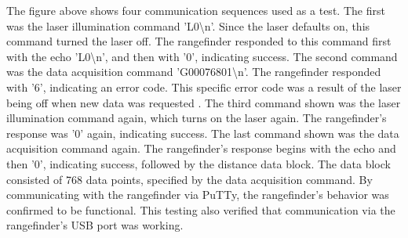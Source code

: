 The figure above shows four communication sequences used as a test. The first was the laser illumination command 'L0\textbackslash{}n'. Since the laser defaults on, this command turned the laser off. The rangefinder responded to this command first with the echo 'L0\textbackslash{}n', and then with '0', indicating success. The second command was the data acquisition command 'G00076801\textbackslash{}n'. The rangefinder responded with '6', indicating an error code. This specific error code was a result of the laser being off when new data was requested \cite{urg04lx_datasheet}. The third command shown was the laser illumination command again, which turns on the laser again. The rangefinder's response was '0' again, indicating success. The last command shown was the data acquisition command again. The rangefinder's response begins with the echo and then '0', indicating success, followed by the distance data block. The data block consisted of 768 data points, specified by the data acquisition command. By communicating with the rangefinder via PuTTy, the rangefinder's behavior was confirmed to be functional. This testing also verified that communication via the rangefinder's USB port was working.

